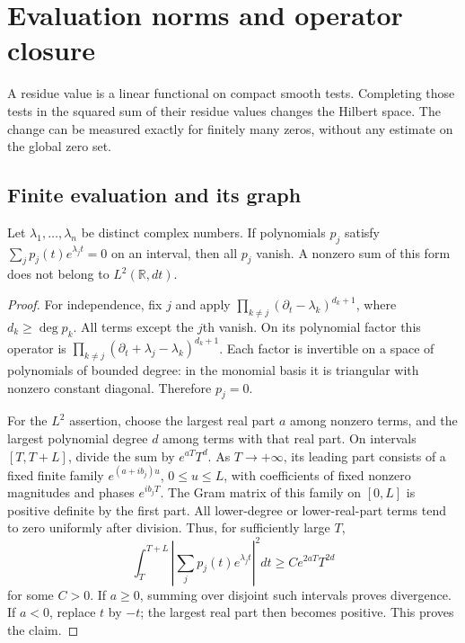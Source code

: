 \chapter{Evaluation norms and operator closure}

A residue value is a linear functional on compact smooth tests.
Completing those tests in the squared sum of their residue values
changes the Hilbert space. The change can be measured exactly for
finitely many zeros, without any estimate on the global zero set.

\section{Finite evaluation and its graph}

\begin{lemma}
\label{mo:exponential-polynomials}
Let $\lambda_1,\ldots,\lambda_n$ be distinct complex numbers.
If polynomials $p_j$ satisfy
$\sum_j p_j(t)e^{\lambda_jt}=0$ on an interval, then all $p_j$ vanish.
A nonzero sum of this form does not belong to $L^2(\mathbb R,dt)$.
\end{lemma}
\begin{proof}
For independence, fix $j$ and apply
$\prod_{k\ne j}(\partial_t-\lambda_k)^{d_k+1}$, where
$d_k\geq\deg p_k$. All terms except the $j$th vanish. On its
polynomial factor this operator is
$\prod_{k\ne j}(\partial_t+\lambda_j-\lambda_k)^{d_k+1}$.
Each factor is invertible on a space of polynomials of bounded
degree: in the monomial basis it is triangular with nonzero
constant diagonal. Therefore $p_j=0$.

For the $L^2$ assertion, choose the largest real part $a$ among
nonzero terms, and the largest polynomial degree $d$ among terms
with that real part. On intervals $[T,T+L]$, divide the sum by
$e^{aT}T^d$. As $T\to+\infty$, its leading part consists of a fixed
finite family $e^{(a+ib_j)u}$, $0\leq u\leq L$, with coefficients
of fixed nonzero magnitudes and phases $e^{ib_jT}$. The Gram
matrix of this family on $[0,L]$ is positive definite by the first
part. All lower-degree or lower-real-part terms tend to zero
uniformly after division. Thus, for sufficiently large $T$,
\[
 \int_T^{T+L}\left|\sum_jp_j(t)e^{\lambda_jt}\right|^2dt
 \geq C e^{2aT}T^{2d}
\]
for some $C>0$. If $a\geq0$, summing over disjoint such intervals
proves divergence. If $a<0$, replace $t$ by $-t$; the largest
real part then becomes positive. This proves the claim.
\end{proof}

